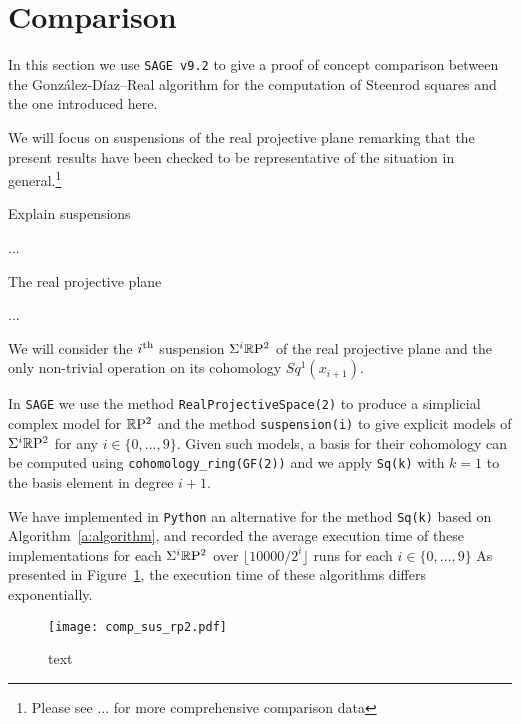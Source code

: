 
\section{Comparison}

In this section we use \verb|SAGE v9.2| to give a proof of concept comparison between the Gonz\'alez-D\'iaz--Real algorithm for the computation of Steenrod squares and the one introduced here.

We will focus on suspensions of the real projective plane remarking that the present results have been checked to be representative of the situation in general.\footnote{Please see ... for more comprehensive comparison data}

Explain suspensions 

...

The real projective plane

...

We will consider the $i^\mathrm{th}$ suspension $\Sigma^i \mathbb{R}\mathrm{P}^2$ of the real projective plane and the only non-trivial operation on its cohomology $Sq^1(x_{i+1})$.

In \verb|SAGE| we use the method \verb|RealProjectiveSpace(2)| to produce a simplicial complex model for $\mathbb{R}\mathrm{P}^2$ and the method \verb|suspension(i)| to give explicit models of $\Sigma^i \mathbb{R}\mathrm{P}^2$ for any $i \in \{0, \dots, 9\}$.
Given such models, a basis for their cohomology can be computed using \verb|cohomology_ring(GF(2))| and we apply \verb|Sq(k)| with $k=1$ to the basis element in degree $i+1$. 

We have implemented in \verb|Python| an alternative for the method \verb|Sq(k)| based on Algorithm~\ref{a:algorithm}, and recorded the average execution time of these implementations for each $\Sigma^i \mathbb{R}\mathrm{P}^2$ over $\lfloor 10000/2^i \rfloor$ runs for each $i \in \{0, \dots, 9\}$
As presented in Figure~\ref{f:comparison}, the execution time of these algorithms differs exponentially.

\begin{figure}
	\texttt{[image: comp\_sus\_rp2.pdf]}
	\caption{text}
	\label{f:comparison}
\end{figure}
